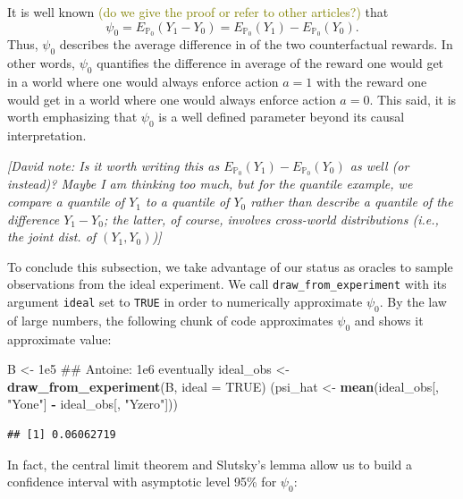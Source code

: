 \documentclass[]{article}
\newenvironment{Shaded}{\begin{snugshade}}{\end{snugshade}}
\newcommand{\DataTypeTok}[1]{\textcolor[rgb]{0.13,0.29,0.53}{#1}}
\newcommand{\FloatTok}[1]{\textcolor[rgb]{0.00,0.00,0.81}{#1}}
\newcommand{\KeywordTok}[1]{\textcolor[rgb]{0.13,0.29,0.53}{\textbf{#1}}}
\newcommand{\NormalTok}[1]{#1}
\newcommand{\OperatorTok}[1]{\textcolor[rgb]{0.81,0.36,0.00}{\textbf{#1}}}
\newcommand{\OtherTok}[1]{\textcolor[rgb]{0.56,0.35,0.01}{#1}}
\newcommand{\StringTok}[1]{\textcolor[rgb]{0.31,0.60,0.02}{#1}}
\newcommand{\bbP}{\mathbb{P}}
\newcommand{\tcg}[1]{\textcolor{olive}{#1}}
\theoremstyle{definition}
\theoremstyle{definition}
\theoremstyle{definition}
\theoremstyle{remark}
\begin{document}
It is well known
\tcg{(do we give the proof or refer to other articles?)} that
\begin{equation} \label{eq:psi:zero}    
\psi_{0}  =  E_{\bbP_{0}} \left(Y_{1}  -  Y_{0}\right)  = E_{\bbP_{0}}(Y_1)  -
E_{\bbP_{0}}(Y_0).   \end{equation} Thus, \(\psi_{0}\) describes the
average difference in of the two counterfactual rewards. In other words,
\(\psi_{0}\) quantifies the difference in average of the reward one
would get in a world where one would always enforce action \(a=1\) with
the reward one would get in a world where one would always enforce
action \(a=0\). This said, it is worth emphasizing that \(\psi_{0}\) is
a well defined parameter beyond its causal interpretation.

\emph{{[}David note: Is it worth writing this as
\(E_{\bbP_{0}}(Y_1) - E_{\bbP_{0}}(Y_0)\) as well (or instead)? Maybe I
am thinking too much, but for the quantile example, we compare a
quantile of \(Y_1\) to a quantile of \(Y_0\) rather than describe a
quantile of the difference \(Y_1 - Y_0\); the latter, of course,
involves cross-world distributions (i.e., the joint dist. of
\((Y_1,Y_0)\)){]}}

To conclude this subsection, we take advantage of our status as oracles
to sample observations from the ideal experiment. We call
\texttt{draw\_from\_experiment} with its argument \texttt{ideal} set to
\texttt{TRUE} in order to numerically approximate \(\psi_{0}\). By the
law of large numbers, the following chunk of code approximates
\(\psi_{0}\) and shows it approximate value:

\begin{Shaded}
\begin{Highlighting}[]
\NormalTok{B <-}\StringTok{ }\FloatTok{1e5}\NormalTok{ ## Antoine: 1e6 eventually}
\NormalTok{ideal_obs <-}\StringTok{ }\KeywordTok{draw_from_experiment}\NormalTok{(B, }\DataTypeTok{ideal =} \OtherTok{TRUE}\NormalTok{)}
\NormalTok{(psi_hat <-}\StringTok{ }\KeywordTok{mean}\NormalTok{(ideal_obs[, }\StringTok{"Yone"}\NormalTok{] }\OperatorTok{-}\StringTok{ }\NormalTok{ideal_obs[, }\StringTok{"Yzero"}\NormalTok{]))}
\end{Highlighting}
\end{Shaded}

\begin{verbatim}
## [1] 0.06062719
\end{verbatim}

In fact, the central limit theorem and Slutsky's lemma allow us to build
a confidence interval with asymptotic level 95\% for \(\psi_{0}\):
\end{document}
